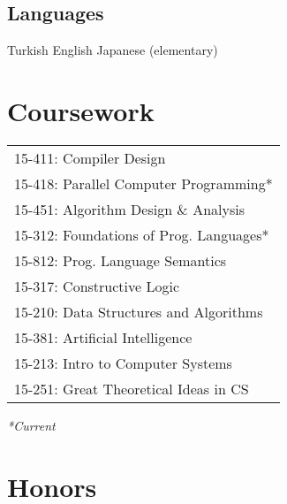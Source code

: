 \documentclass[letterpaper]{deedy-resume} %
\begin{document}
\begin{minipage}[t]{0.33\textwidth}
\sectionspace %


\subsection{Languages}

Turkish \textbullet{} English \textbullet{} Japanese (elementary)

\sectionspace %


\section{Coursework}

\begingroup
\renewcommand*{\arraystretch}{1.05}
\begin{tabular}{@{}l@{}}
15-411: Compiler Design \\
15-418: Parallel Computer Programming* \\
15-451: Algorithm Design \& Analysis \\
15-312: Foundations of Prog. Languages* \\
15-812: Prog. Language Semantics \\
15-317: Constructive Logic \\
15-210: Data Structures and Algorithms \\
15-381: Artificial Intelligence \\
15-213: Intro to Computer Systems \\
15-251: Great Theoretical Ideas in CS
\end{tabular}
\endgroup

\null\hfill {\footnotesize \textit{*Current}}

\sectionspace %

\section{Honors}

\sectionspace %


\end{minipage}
\end{document}

